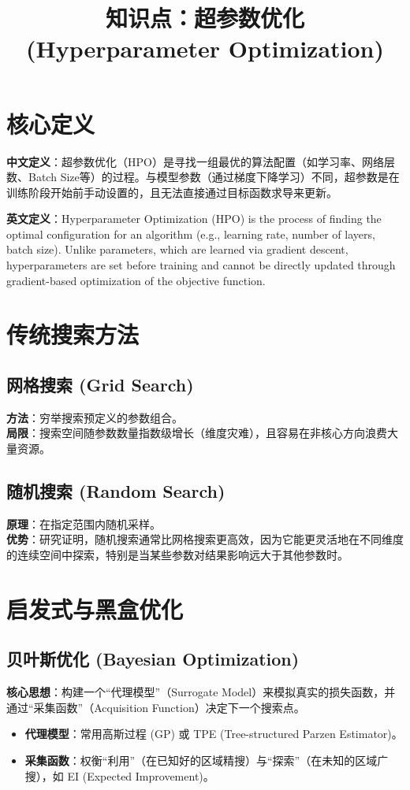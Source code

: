 \documentclass[12pt, a4paper]{article}
\title{知识点：超参数优化 (Hyperparameter Optimization)}
\author{}
\date{}
\begin{document}
\maketitle

\section{核心定义}
\textbf{中文定义}：超参数优化（HPO）是寻找一组最优的算法配置（如学习率、网络层数、Batch Size等）的过程。与模型参数（通过梯度下降学习）不同，超参数是在训练阶段开始前手动设置的，且无法直接通过目标函数求导来更新。

\textbf{英文定义}：Hyperparameter Optimization (HPO) is the process of finding the optimal configuration for an algorithm (e.g., learning rate, number of layers, batch size). Unlike parameters, which are learned via gradient descent, hyperparameters are set before training and cannot be directly updated through gradient-based optimization of the objective function.

\section{传统搜索方法}

\subsection{网格搜索 (Grid Search)}
\textbf{方法}：穷举搜索预定义的参数组合。
\\ \textbf{局限}：搜索空间随参数数量指数级增长（维度灾难），且容易在非核心方向浪费大量资源。

\subsection{随机搜索 (Random Search)}
\textbf{原理}：在指定范围内随机采样。
\\ \textbf{优势}：研究证明，随机搜索通常比网格搜索更高效，因为它能更灵活地在不同维度的连续空间中探索，特别是当某些参数对结果影响远大于其他参数时。

\section{启发式与黑盒优化}

\subsection{贝叶斯优化 (Bayesian Optimization)}
\textbf{核心思想}：构建一个“代理模型”（Surrogate Model）来模拟真实的损失函数，并通过“采集函数”（Acquisition Function）决定下一个搜索点。
\begin{itemize}
    \item \textbf{代理模型}：常用高斯过程 (GP) 或 TPE (Tree-structured Parzen Estimator)。
    \item \textbf{采集函数}：权衡“利用”（在已知好的区域精搜）与“探索”（在未知的区域广搜），如 EI (Expected Improvement)。
\end{itemize}
\end{document}
